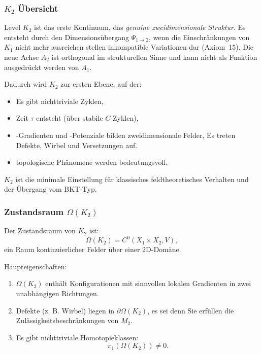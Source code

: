 

\subsubsection{\texorpdfstring{$K_2$}{K_2} Übersicht}
\label{sec:k2-overview}

Level $K_2$ ist das erste Kontinuum, das \emph{genuine
zweidimensionale Struktur}. Es entsteht durch den Dimensionsübergang
$\Psi_{1\to2}$, wenn die Einschränkungen von $K_1$ nicht mehr ausreichen
stellen inkompatible Variationen dar (Axiom~15). Die neue Achse $A_2$ ist
orthogonal im strukturellen Sinne und kann nicht als Funktion ausgedrückt werden
von $A_1$.

Dadurch wird $K_2$ zur ersten Ebene, auf der:
\begin{itemize}
    \item Es gibt nichttriviale Zyklen,
    \item Zeit $\tau$ entsteht (über stabile $C$-Zyklen),
    \item-Gradienten und -Potenziale bilden zweidimensionale Felder,
    Es treten Defekte, Wirbel und Versetzungen auf.
    \item topologische Phänomene werden bedeutungsvoll.
\end{itemize}

$K_2$ ist die minimale Einstellung für klassisches feldtheoretisches Verhalten und
der Übergang vom BKT-Typ.

\subsubsection{Zustandsraum \texorpdfstring{$\Omega(K_2)$}{\Omega(K_2)}}

Der Zustandsraum von $K_2$ ist:
\[
\Omega(K_2) = C^0(X_1 \times X_2, V),
\]
ein Raum kontinuierlicher Felder über einer 2D-Domäne.

Haupteigenschaften:
\begin{enumerate}
    \item $\Omega(K_2)$ enthält Konfigurationen mit sinnvollen lokalen
          Gradienten in zwei unabhängigen Richtungen.
    \item Defekte (z. B. Wirbel) liegen in $\partial\Omega(K_2)$, es sei denn
          Sie erfüllen die Zulässigkeitsbeschränkungen von $M_2$.
    \item Es gibt nichttriviale Homotopieklassen:
          \[
          \pi_1(\Omega(K_2)) \neq 0.
          \]
\end{enumerate}

